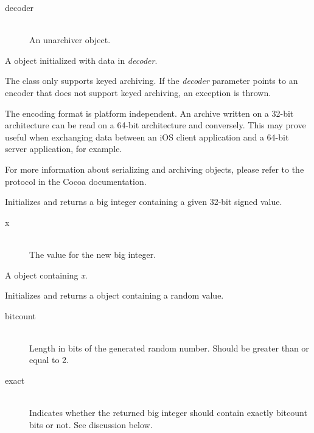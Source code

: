 \begin{description}
\item[decoder] \hfill \\ An unarchiver object.
\end{description}

\docretval

A  object initialized with data in \emph{decoder}.

\docdiscuss

The  class only supports keyed archiving. If the \emph{decoder} parameter points to an encoder that does not support keyed archiving, an exception is thrown.

The encoding format is platform independent. An archive written on a 32-bit architecture can be read on a 64-bit architecture and conversely. This may prove useful when exchanging data between an iOS client application and a 64-bit server application, for example.

For more information about serializing and archiving objects, please refer to the  protocol in the Cocoa documentation.



Initializes and returns a big integer containing a given 32-bit signed value.


\docparams

\begin{description}
\item[x] \hfill \\ The value for the new big integer.
\end{description}

\docretval

A  object containing \emph{x}.



Initializes and returns a  object containing a random value.


\docparams

\begin{description}
\item[bitcount] \hfill \\ Length in bits of the generated random number. Should be greater than or equal to 2.
\item[exact] \hfill \\ Indicates whether the returned big integer should contain exactly bitcount bits or not. See discussion below.
\end{description}

